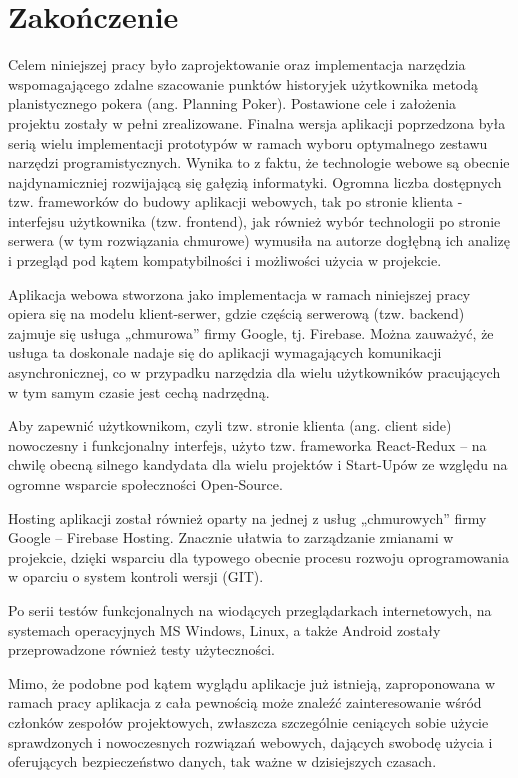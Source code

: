 ﻿\chapter*{Zakończenie}

Celem niniejszej pracy było zaprojektowanie oraz implementacja narzędzia wspomagającego zdalne szacowanie punktów historyjek użytkownika metodą planistycznego pokera (ang. Planning Poker).
Postawione cele i założenia projektu zostały w pełni zrealizowane.
Finalna wersja aplikacji poprzedzona była serią wielu implementacji prototypów w ramach wyboru optymalnego zestawu narzędzi programistycznych.
Wynika to z faktu, że technologie webowe są obecnie najdynamiczniej rozwijającą się gałęzią informatyki.
Ogromna liczba dostępnych tzw. frameworków do budowy aplikacji webowych, tak po stronie klienta - interfejsu użytkownika (tzw. frontend),
jak również wybór technologii po stronie serwera (w tym rozwiązania chmurowe)
wymusiła na autorze dogłębną ich analizę i przegląd pod kątem kompatybilności i możliwości użycia w projekcie.


Aplikacja webowa stworzona jako implementacja w ramach niniejszej pracy opiera się na modelu klient-serwer,
gdzie częścią serwerową (tzw. backend) zajmuje się usługa „chmurowa” firmy Google, tj. Firebase. Można zauważyć,
że usługa ta doskonale nadaje się do aplikacji wymagających komunikacji asynchronicznej,
co w przypadku narzędzia dla wielu użytkowników pracujących w tym samym czasie jest cechą nadrzędną.

Aby zapewnić użytkownikom, czyli tzw. stronie klienta (ang. client side) nowoczesny i funkcjonalny interfejs,
użyto tzw. frameworka React-Redux – na chwilę obecną silnego kandydata dla wielu projektów i Start-Upów ze względu na ogromne wsparcie społeczności Open-Source.

Hosting aplikacji został również oparty na jednej z usług „chmurowych” firmy Google – Firebase Hosting.
Znacznie ułatwia to zarządzanie zmianami w projekcie, dzięki wsparciu dla typowego obecnie procesu rozwoju oprogramowania w oparciu o system kontroli wersji (GIT).

Po serii testów funkcjonalnych na wiodących przeglądarkach internetowych, na systemach operacyjnych MS Windows,
Linux, a także Android zostały przeprowadzone również testy użyteczności.

Mimo, że podobne pod kątem wyglądu aplikacje już istnieją,
zaproponowana w ramach pracy aplikacja z cała pewnością może znaleźć zainteresowanie wśród członków zespołów projektowych,
zwłaszcza szczególnie ceniących sobie użycie sprawdzonych i nowoczesnych rozwiązań webowych,
dających swobodę użycia i oferujących bezpieczeństwo danych, tak ważne w dzisiejszych czasach.


